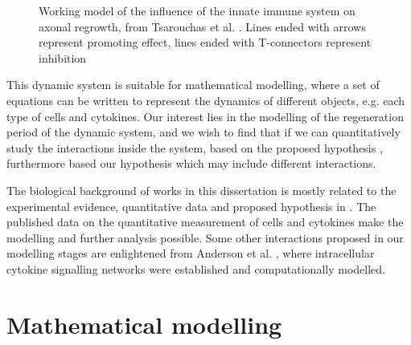\begin{figure}[t]
    \begin{center}
    \end{center}

    \caption[Working model of the influence of the innate immune system on axonal regrowth]%
    {Working model of the influence of the innate immune system on axonal regrowth, from Tsarouchas et al. \cite{ref:Tsarouchas}. Lines ended with arrows represent promoting effect, lines ended with T-connectors represent inhibition}
    \label{fig:map}

\end{figure}

This dynamic system is suitable for mathematical modelling, where a set of equations can be written to represent the dynamics of different objects, e.g. each type of cells and cytokines. Our interest lies in the modelling of the regeneration period of the dynamic system, and we wish to find that if we can quantitatively study the interactions inside the system, based on the proposed hypothesis \cite{ref:Tsarouchas},  furthermore based our hypothesis which may include different interactions.

The biological background of works in this dissertation is mostly related to the experimental evidence, quantitative data and proposed hypothesis in \cite{ref:Tsarouchas}. The published data on the quantitative measurement of cells and cytokines make the modelling and further analysis possible. Some other interactions proposed in our modelling stages are enlightened from Anderson et al. \cite{Anderson}, where intracellular cytokine signalling networks were established and computationally modelled.

\section{Mathematical modelling}


